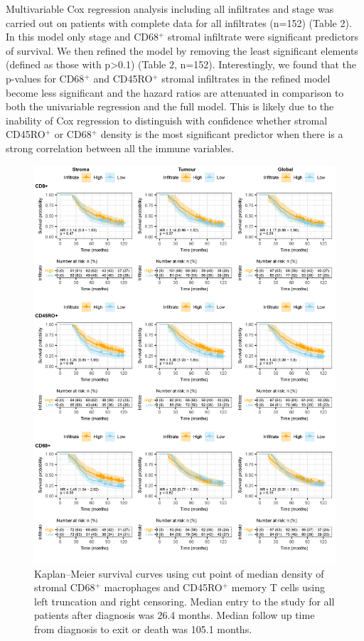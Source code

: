 Multivariable Cox regression analysis including all infiltrates and stage was carried out on patients with complete data for all infiltrates (n=152) (Table 2).  In this model only stage and CD68$^+$ stromal infiltrate were significant predictors of survival. 
We then refined the model by removing the least significant elements (defined as those with p>0.1) (Table 2, n=152). Interestingly, we found that the p-values for CD68$^+$ and CD45RO$^+$ stromal infiltrates in the refined model become less significant and the hazard ratios are attenuated in comparison to both the univariable regression and the full model. This is likely due to the inability of Cox regression to distinguish with confidence whether stromal CD45RO$^+$ or CD68$^+$ density is the most significant predictor when there is a strong correlation between all the immune variables.

\begin{figure}
    \centering
    \includegraphics{Chapter2/Figs/Raster/KM_allinf.png}
    \caption[KM Survival curves for individual infiltrates]{Kaplan–Meier survival curves using cut point of median density of stromal CD68$^+$ macrophages and CD45RO$^+$ memory T cells using left truncation and right censoring. Median entry to the study for all patients after diagnosis was 26.4 months. Median follow up time from diagnosis to exit or death was 105.1 months.}
    \label{fig:KM_infiltrates}
\end{figure}


